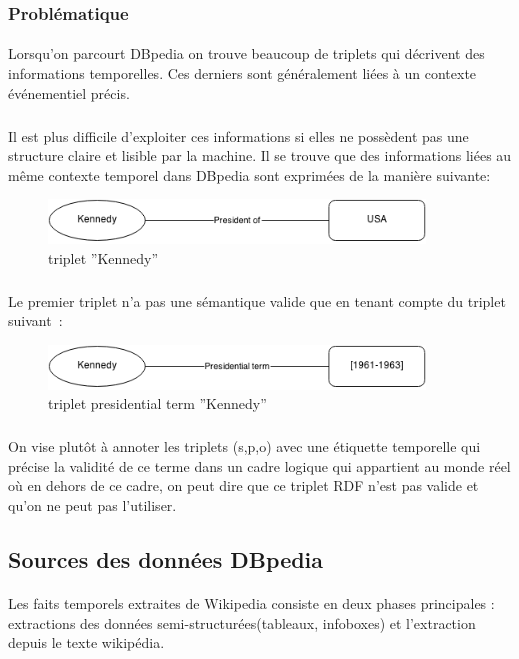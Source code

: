 \subsubsection*{Problématique}
\paragraph{}
Lorsqu’on parcourt DBpedia on trouve beaucoup de triplets qui décrivent des informations temporelles. Ces derniers sont généralement liées à un contexte événementiel précis.
\subparagraph{}
Il est plus difficile d’exploiter ces informations si elles ne possèdent pas une structure claire et lisible par la machine.
\newline
Il se trouve que des informations liées au même contexte temporel dans DBpedia sont exprimées de la manière suivante: 
\begin{figure}[H]
        \centering
                \centering
                \includegraphics[width=10cm]{ken.png}
               \caption{triplet ''Kennedy''}

\end{figure}
\subparagraph{}
Le premier triplet n'a pas une sémantique valide que en tenant compte du triplet suivant~: 
\begin{figure}[H]
        \centering
                \centering
                \includegraphics[width=10cm]{presidterm.png}
               \caption{triplet presidential term ''Kennedy''}

\end{figure}
\subparagraph{}
On vise plutôt à annoter les triplets (s,p,o) avec une étiquette temporelle qui précise la validité de ce terme dans un cadre logique qui appartient au monde réel où en dehors de ce cadre, on peut dire que ce triplet RDF n’est pas valide et qu’on ne peut pas l’utiliser.
\subsection*{Sources des données DBpedia}
\paragraph{}
Les faits temporels extraites de Wikipedia consiste en deux phases principales : extractions des données semi-structurées(tableaux, infoboxes) et l’extraction depuis le texte wikipédia.
